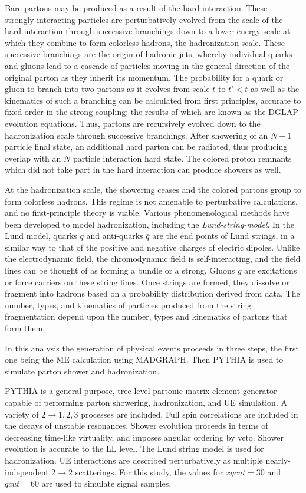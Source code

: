 Bare partons may be produced as a result of the hard interaction. These strongly-interacting particles are perturbatively evolved from the scale of the hard interaction through successive branchings down to a lower energy scale at which they combine to form colorless hadrons, the hadronization scale. These successive branchings are the origin of hadronic jets, whereby individual quarks and gluons lead to a cascade of particles moving in the general direction of the original parton as they inherit its momentum. The probability for a quark or gluon to branch into two partons as it evolves from scale $t$ to $t'<t$ as well as the kinematics of such a branching can be calculated from first principles, accurate to fixed order in the strong coupling; the results of which are known as the DGLAP evolution equations\cite{Altarelli:1977zs}. Thus, partons are recursively evolved down to the hadronization scale through successive branchings. After showering of an $N-1$ particle final state, an additional hard parton can be radiated, thus producing overlap with an $N$ particle interaction hard state. The colored proton remnants which did not take part in the hard interaction can produce showers as well. 

At the hadronization scale, the showering ceases and the colored partons group to form colorless hadrons. This regime is not amenable to perturbative calculations, and no first-principle theory is viable. Various phenomenological methods have been developed to model hadronization, including the \textit{Lund-string-model}\cite{ANDERSSON198331}. In the Lund model, quarks $q$ and anti-quarks $\bar{q}$ are the end points of Lund strings, in a similar way to that of the positive and negative charges of electric dipoles. Unlike the electrodynamic field, the chromodynamic field is self-interacting, and the field lines can be thought of as forming a bundle or a strong. Gluons $g$ are excitations or force carriers on these string lines. Once strings are formed, they dissolve or fragment into hadrons based on a probability distribution derived from data. The number, types, and kinematics of particles produced from the string fragmentation depend upon the number, types and kinematics of partons that form them. 

In this analysis the generation of physical events proceeds in three steps, the first one being the ME calculation using MADGRAPH\cite{Alwall:1647049}. Then PYTHIA\cite{Sjostrand:2014zea} is used to simulate parton shower and hadronization.

PYTHIA is a general purpose, tree level partonic matrix element generator capable of performing parton showering, hadronization, and UE simulation. A variety of $2\rightarrow1,2,3$ processes are included. Full spin correlations are included in the decays of unstable resonances. Shower evolution proceeds in terms of decreasing time-like virtuality, and imposes angular ordering by veto. Shower evolution is accurate to the LL level. The Lund string model is used for hadronization. UE interactions are described perturbatively as multiple nearly-independent $2\rightarrow 2$ scatterings. For this study, the values for $xqcut=30$ and $qcut=60$ are used to simulate signal samples.

